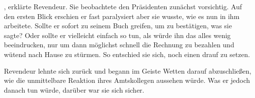 , erklärte Revendeur.
Sie beobachtete den Präsidenten zunächst vorsichtig.
Auf den ersten Blick erschien er fast paralysiert aber sie wusste, wie es nun in ihm arbeitete.
Sollte er sofort zu seinem Buch greifen, um zu bestätigen, was sie sagte?
Oder sollte er vielleicht einfach so tun, als würde ihn das alles wenig beeindrucken, nur um dann möglichst schnell die Rechnung zu bezahlen und wütend nach Hause zu stürmen.
So entschied sie sich, noch einen drauf zu setzen.

\par

Revendeur lehnte sich zurück und begann im Geiste Wetten darauf abzuschließen, wie die unmittelbare Reaktion ihres Amtskollegen aussehen würde.
Was er jedoch danach tun würde, darüber war sie sich sicher.